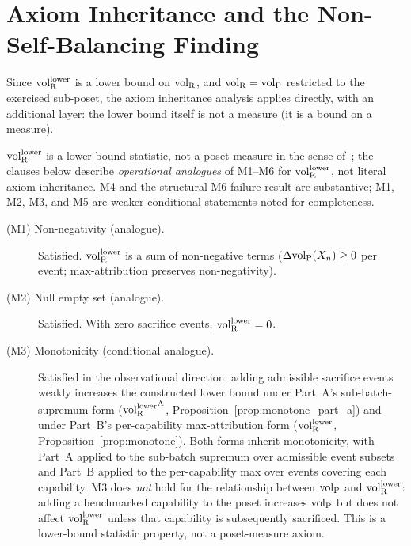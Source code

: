 \section{Axiom Inheritance and the Non-Self-Balancing Finding}
\label{sec:axiom_inheritance}

Since ${\operatorname{vol}_{\mathrm{R}}^{\mathrm{lower}}}$ is a lower bound on ${\operatorname{vol}_{\mathrm{R}}}$, and ${\operatorname{vol}_{\mathrm{R}}} =
{\operatorname{vol}_{\mathrm{P}}}$ restricted to the exercised sub-poset, the axiom
inheritance analysis applies directly, with an additional layer:
the lower bound itself is not a measure (it is a bound on a
measure).

\begin{theorem}
\label{thm:axiom_inheritance}
${\operatorname{vol}_{\mathrm{R}}^{\mathrm{lower}}}$ is a lower-bound statistic, not a poset measure in
the sense of~\citep[Proposition~1]{lasser2026poset}; the clauses
below describe \emph{operational analogues} of M1--M6 for
${\operatorname{vol}_{\mathrm{R}}^{\mathrm{lower}}}$, not literal axiom inheritance.  M4 and the
structural M6-failure result are substantive; M1, M2, M3, and
M5 are weaker conditional statements noted for completeness.

\begin{description}
\item[(M1) Non-negativity (analogue).] Satisfied.  ${\operatorname{vol}_{\mathrm{R}}^{\mathrm{lower}}}$ is
  a sum of non-negative terms ($\Delta{\operatorname{vol}_{\mathrm{P}}}(X_n) \geq 0$ per event;
  max-attribution preserves non-negativity).

\item[(M2) Null empty set (analogue).] Satisfied.  With zero
  sacrifice events, ${\operatorname{vol}_{\mathrm{R}}^{\mathrm{lower}}} = 0$.

\item[(M3) Monotonicity (conditional analogue).] Satisfied in
  the observational direction: adding admissible sacrifice
  events weakly increases the constructed lower bound under
  Part~A's sub-batch-supremum form
  (${\operatorname{vol}_{\mathrm{R}}^{\mathrm{lower}}}^{\mathrm{A}}$,
  Proposition~\ref{prop:monotone_part_a}) and under Part~B's
  per-capability max-attribution form
  (${\operatorname{vol}_{\mathrm{R}}^{\mathrm{lower}}}$,
  Proposition~\ref{prop:monotone}).  Both forms inherit
  monotonicity, with Part~A applied to the sub-batch supremum
  over admissible event subsets and Part~B applied to the
  per-capability max over events covering each capability.
  M3 does \emph{not} hold
  for the relationship between ${\operatorname{vol}_{\mathrm{P}}}$ and ${\operatorname{vol}_{\mathrm{R}}^{\mathrm{lower}}}$: adding
  a benchmarked capability to the poset increases ${\operatorname{vol}_{\mathrm{P}}}$ but
  does not affect ${\operatorname{vol}_{\mathrm{R}}^{\mathrm{lower}}}$ unless that capability is
  subsequently sacrificed.  This is a lower-bound statistic
  property, not a poset-measure axiom.


\end{description}
\end{theorem}
